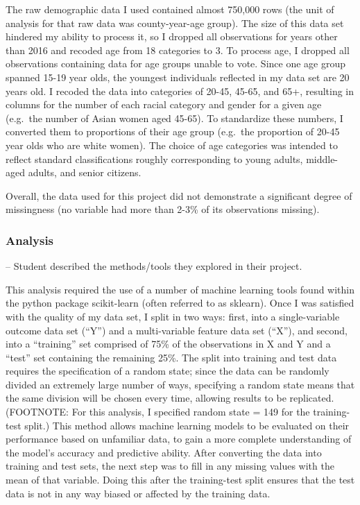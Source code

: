 \documentclass[11pt]{article}
\begin{document}
    The raw demographic data I used contained almost 750,000 rows (the unit
of analysis for that raw data was county-year-age group). The size of
this data set hindered my ability to process it, so I dropped all
observations for years other than 2016 and recoded age from 18
categories to 3. To process age, I dropped all observations containing
data for age groups unable to vote. Since one age group spanned 15-19
year olds, the youngest individuals reflected in my data set are 20
years old. I recoded the data into categories of 20-45, 45-65, and 65+,
resulting in columns for the number of each racial category and gender
for a given age (e.g.~the number of Asian women aged 45-65). To
standardize these numbers, I converted them to proportions of their age
group (e.g.~the proportion of 20-45 year olds who are white women). The
choice of age categories was intended to reflect standard
classifications roughly corresponding to young adults, middle-aged
adults, and senior citizens.

    Overall, the data used for this project did not demonstrate a
significant degree of missingness (no variable had more than 2-3\% of
its observations missing).

    \hypertarget{analysis}{%
\subsubsection{Analysis}\label{analysis}}

-- Student described the methods/tools they explored in their project.

This analysis required the use of a number of machine learning tools
found within the python package scikit-learn (often referred to as
sklearn). Once I was satisfied with the quality of my data set, I split
in two ways: first, into a single-variable outcome data set (``Y'') and
a multi-variable feature data set (``X''), and second, into a
``training'' set comprised of 75\% of the observations in X and Y and a
``test'' set containing the remaining 25\%. The split into training and
test data requires the specification of a random state; since the data
can be randomly divided an extremely large number of ways, specifying a
random state means that the same division will be chosen every time,
allowing results to be replicated. (FOOTNOTE: For this analysis, I
specified random state = 149 for the training-test split.) This method
allows machine learning models to be evaluated on their performance
based on unfamiliar data, to gain a more complete understanding of the
model's accuracy and predictive ability. After converting the data into
training and test sets, the next step was to fill in any missing values
with the mean of that variable. Doing this after the training-test split
ensures that the test data is not in any way biased or affected by the
training data.
\end{document}
